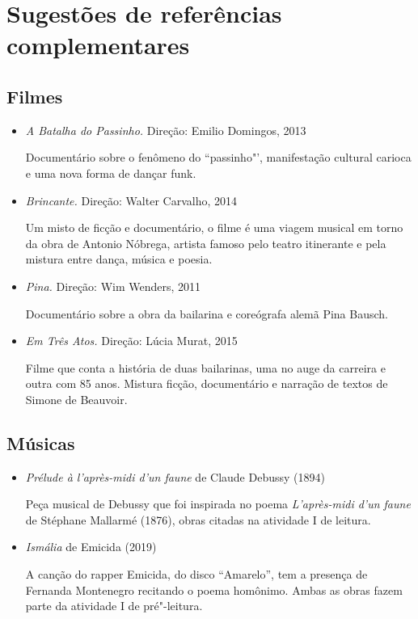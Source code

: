 \documentclass[12pt]{extarticle}
\begin{document}
\section{Sugestões de referências complementares}\label{sugestoes}

\subsection {Filmes}

\begin{itemize}

\item \textit{A Batalha do Passinho.} Direção: Emilio Domingos, 2013

Documentário sobre o fenômeno do ``passinho"', manifestação cultural carioca e uma nova forma de dançar funk.

\item \textit{Brincante.} Direção: Walter Carvalho, 2014

Um misto de ficção e documentário, o filme é uma viagem musical em torno da obra de
Antonio Nóbrega, artista famoso pelo teatro itinerante e pela mistura entre dança,
música e poesia.

\item \textit{Pina.} Direção: Wim Wenders, 2011

Documentário sobre a obra da bailarina e coreógrafa alemã Pina Bausch.

\item \textit{Em Três Atos.} Direção: Lúcia Murat, 2015

Filme que conta a história de duas bailarinas, uma no auge da carreira e outra com 85 anos. Mistura ficção, documentário e narração de textos de Simone de Beauvoir.

\end{itemize}

\subsection{Músicas}

\begin{itemize}

\item \textit{Prélude à l'après-midi
d'un faune} de Claude Debussy (1894)

Peça musical de Debussy que foi inspirada no poema \textit{L'après-midi d'un faune} 
de Stéphane Mallarmé (1876), obras citadas na atividade I de leitura.

\item \textit{Ismália} de Emicida (2019)

A canção do rapper Emicida, do disco ``Amarelo'', tem a presença de Fernanda Montenegro recitando o poema homônimo. Ambas as obras fazem parte da atividade I de pré"-leitura.

\end{itemize}
\end{document}
